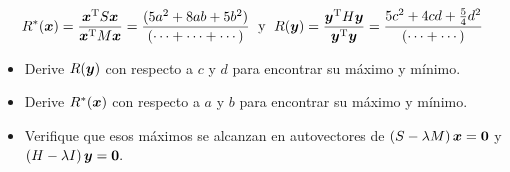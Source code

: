 \documentclass[12pt,a4paper]{article}
\newcommand{\bi}[1]{\hbox{\boldmath$#1$}}
\newcommand\1{\mbox{\,\vrule height-0.8pt depth1.0pt width2pc\,}}
\newcommand\2{\mbox{\,\vrule height-0.8pt depth1.0pt width1pc\,}}
\DeclareRobustCommand\transp{^{\mathrm{T}}}
\begin{document}
\begin{enumerate}
\vspace{-11pt}
\hspace{-16pt}
$$R^\ast(\bi{x})=\dfrac{\bi{x}\transp S\bi{x}}{\bi{x}\transp M\bi{x}}=\dfrac{(5a^2+8ab+5b^2)}{(\cdots+\cdots+\cdots)} \text{\; y \;} R(\bi{y})=\dfrac{\bi{y}\transp H\bi{y}}{\bi{y}\transp \bi{y}}=\dfrac{5c^2+4cd+\frac54 d^2}{(\cdots+\cdots)}$$

\begin{itemize}
\item [(b)] Derive $R(\bi{y})$ con respecto a $c$ y $d$ para encontrar su máximo y mínimo. %
\item [(c)] Derive $R^\ast(\bi{x})$ con respecto a $a$ y $b$ para encontrar su máximo y mínimo. %
\item [(d)] Verifique que esos máximos se alcanzan en autovectores de $(S-\lambda M)\,\bi{x}=\bi{0}$ y\linebreak\vspace{-11pt}
$(H-\lambda I)\,\bi{y}=\bi{0}.$%
\end{itemize}


\end{enumerate}
\end{document}
